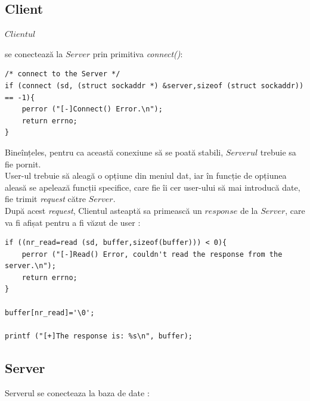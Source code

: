 \documentclass[runningheads]{llncs}
\begin{document}
\subsection{Client}
\hypertarget{sec:detailsConnect}{$Clientul$} se conectează la $Server$ prin primitiva \textit{connect()}:
\begin{verbatim}
/* connect to the Server */
if (connect (sd, (struct sockaddr *) &server,sizeof (struct sockaddr)) == -1){
    perror ("[-]Connect() Error.\n");
    return errno;
}
\end{verbatim}
Bineînțeles, pentru ca această conexiune să se poată stabili, $Serverul$ trebuie sa fie pornit.\\
User-ul trebuie să aleagă o opțiune din meniul dat, iar în funcție de opțiunea aleasă se apelează funcții specifice, care fie îi cer user-ului să mai introducă date, fie trimit \textit{request} către $Server$.\\
După acest \textit{request}, Clientul asteaptă sa primească un $response$ de la $Server$, care va fi afișat pentru a fi văzut de user :
\begin{verbatim}
if ((nr_read=read (sd, buffer,sizeof(buffer))) < 0){
    perror ("[-]Read() Error, couldn't read the response from the server.\n");
    return errno;
}	

buffer[nr_read]='\0';	

printf ("[+]The response is: %s\n", buffer);
\end{verbatim}
	
\subsection{Server}
Serverul se conecteaza la baza de date : 
\end{document}
